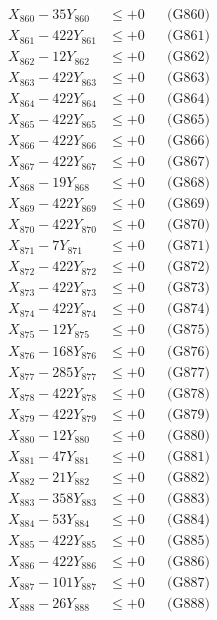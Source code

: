 \documentclass[a4paper,10pt]{article}
\begin{document}
{\begin{align}
X_{860} - 35Y_{860} &\leq +0 && \text{(G860)} \\
\allowbreak
X_{861} - 422Y_{861} &\leq +0 && \text{(G861)} \\
X_{862} - 12Y_{862} &\leq +0 && \text{(G862)} \\
X_{863} - 422Y_{863} &\leq +0 && \text{(G863)} \\
X_{864} - 422Y_{864} &\leq +0 && \text{(G864)} \\
X_{865} - 422Y_{865} &\leq +0 && \text{(G865)} \\
X_{866} - 422Y_{866} &\leq +0 && \text{(G866)} \\
X_{867} - 422Y_{867} &\leq +0 && \text{(G867)} \\
X_{868} - 19Y_{868} &\leq +0 && \text{(G868)} \\
X_{869} - 422Y_{869} &\leq +0 && \text{(G869)} \\
X_{870} - 422Y_{870} &\leq +0 && \text{(G870)} \\
\allowbreak
X_{871} - 7Y_{871} &\leq +0 && \text{(G871)} \\
X_{872} - 422Y_{872} &\leq +0 && \text{(G872)} \\
X_{873} - 422Y_{873} &\leq +0 && \text{(G873)} \\
X_{874} - 422Y_{874} &\leq +0 && \text{(G874)} \\
X_{875} - 12Y_{875} &\leq +0 && \text{(G875)} \\
X_{876} - 168Y_{876} &\leq +0 && \text{(G876)} \\
X_{877} - 285Y_{877} &\leq +0 && \text{(G877)} \\
X_{878} - 422Y_{878} &\leq +0 && \text{(G878)} \\
X_{879} - 422Y_{879} &\leq +0 && \text{(G879)} \\
X_{880} - 12Y_{880} &\leq +0 && \text{(G880)} \\
\allowbreak
X_{881} - 47Y_{881} &\leq +0 && \text{(G881)} \\
X_{882} - 21Y_{882} &\leq +0 && \text{(G882)} \\
X_{883} - 358Y_{883} &\leq +0 && \text{(G883)} \\
X_{884} - 53Y_{884} &\leq +0 && \text{(G884)} \\
X_{885} - 422Y_{885} &\leq +0 && \text{(G885)} \\
X_{886} - 422Y_{886} &\leq +0 && \text{(G886)} \\
X_{887} - 101Y_{887} &\leq +0 && \text{(G887)} \\
X_{888} - 26Y_{888} &\leq +0 && \text{(G888)} \\

\end{align}}
\end{document}
